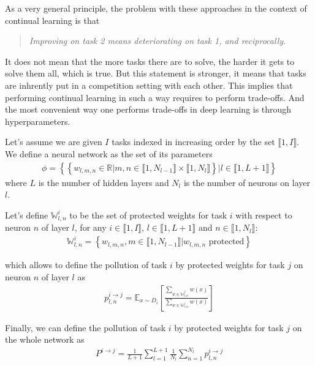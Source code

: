 \documentclass[twocolumn]{article}
\newcommand{\intset}[2]{\llbracket #1, #2 \rrbracket}
\begin{document}
\noindent
As a very general principle, the problem with these approaches in the context of continual learning is that
\begin{quote}
    \itshape
    \centering
    Improving on task 2 means deteriorating on task 1, and reciprocally.
\end{quote}

\noindent
It does not mean that the more tasks there are to solve, the harder it gets to solve them all, which is true. But this statement is stronger, it means that tasks are inhrently put in a competition setting with each other. This implies that performing continual learning in such a way requires to perform trade-offs. And the most convenient way one performs trade-offs in deep learning is through hyperparameters.

\vspace{1mm}
\noindent
Let's assume we are given $I$ tasks indexed in increasing order by the set $\intset{1}{I}$. We define a neural network as the set of its parameters
\begin{align}
    \phi = \left\{\left\{ w_{l,m,n} \in \mathbb{R} | m,n \in \llbracket 1, N_{l-1} \rrbracket \times \llbracket 1, N_{l} \rrbracket \right\} | l \in \llbracket 1, L+1 \rrbracket \right\}
\end{align}
where $L$ is the number of hidden layers and $N_l$ is the number of neurons on layer $l$.

\vspace{1mm}
\noindent
Let's define $\mathbb{W}_{l,n}^i$ to be the set of protected weights for task $i$ with respect to neuron $n$ of layer $l$, for any $i \in \intset{1}{I}$, $l \in \intset{1}{L+1}$ and $n \in \intset{1}{N_l}$:
\begin{align}
    \mathbb{W}_{l,n}^i = \left\{ w_{l,m,n}, m \in \intset{1}{N_{l-1}} | w_{l,m,n} \text{ protected} \right\}
\end{align}

\vspace{1mm}
\noindent
which allows to define the pollution of task $i$ by protected weights for task $j$ on neuron $n$ of layer $l$ as
\begin{align}
    p_{l,n}^{i\rightarrow j} = \mathbb{E}_{x \sim D_i}\left[\frac{\sum_{w \in \mathbb{W}_{l,n}^j}{w(x)}}{\sum_{w \in \mathbb{W}_{l,n}^i}{w(x)}}\right]
\end{align}

\vspace{1mm}
\noindent
Finally, we can define the pollution of task $i$ by protected weights for task $j$ on the whole network as
\begin{align}
    P^{i\rightarrow j} = \frac{1}{L+1}\sum_{l=1}^{L+1}{\frac{1}{N_l}\sum_{n=1}^{N_l}{p_{l,n}^{i\rightarrow j}}}
\end{align}
\end{document}

